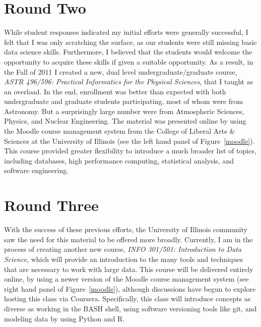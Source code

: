 \section{Round Two~\label{r2}}

While student responses indicated my initial efforts were generally successful, I felt that I was only scratching the surface, as our students were still missing basic data science skills. Furthermore, I believed that the students would welcome the opportunity to acquire these skills if given a suitable opportunity. As a result, in the Fall of 2011 I created a new, dual level undergraduate/graduate course, \textit{ASTR 496/596: Practical Informatics for the Physical Sciences}, that I taught as an overload. In the end, enrollment was better than expected with both undergraduate and graduate students participating, most of whom were from Astronomy. But a surprisingly large number were from Atmospheric Sciences, Physics, and Nuclear Engineering. The material was presented online by using the Moodle course management system from the College of Liberal Arts \& Sciences at the University of Illinois (see the left hand panel of Figure~\ref{moodle}). This course provided greater flexibility to introduce a much broader list of topics, including databases, high performance computing, statistical analysis, and software engineering.


\section{Round Three~\label{r3}}

With the success of these previous efforts, the University of Illinois community saw the need for this material to be offered more broadly. Currently, I am in the process of creating another new course, \textit{INFO 301/501: Introduction to Data Science}, which will provide an introduction to the many tools and techniques that are necessary to work with large data. This course will be delivered entirely online, by using a newer version of the Moodle course management system (see right hand panel of Figure~\ref{moodle}), although discussions have begun to explore hosting this class via Coursera. Specifically, this class will introduce concepts as diverse as working in the BASH shell, using software versioning tools like git, and modeling data by using Python and R.

